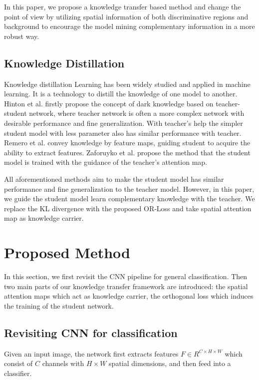 \documentclass{article}
\begin{document}
In this paper, we propose a knowledge transfer based method and change the point of view by utilizing spatial information of both discriminative regions and background to encourage the model mining complementary information in a more robust way.

\subsection{Knowledge Distillation} Knowledge distillation Learning has been widely studied and applied in machine learning. It is a technology to distill the knowledge of one model to another. Hinton et al. \cite{hinton2015distilling} firstly propose the concept of dark knowledge based on teacher-student network, where teacher network is often a more complex network with desirable performance and fine generalization. With teacher's help the simpler student model with less parameter also has similar performance with teacher. Remero et al. \cite{romero2015fitnets} convey knowledge by feature maps, guiding student to acquire the ability to extract features. Zaforuyko et al. \cite{zagoruyko2017paying} propose the method that the student model is trained with the guidance of the teacher's attention map.

All aforementioned methods aim to make the student model has similar performance and fine generalization to the teacher model. However, in this paper, we guide the student model learn complementary knowledge with the teacher. We replace the KL divergence with the proposed OR-Loss and take spatial attention map as knowledge carrier. 


\section{Proposed Method}

In this section, we first revisit the CNN pipeline for general classification. Then two main parts of our knowledge transfer framework are introduced: the spatial attention maps which act as knowledge carrier, the orthogonal loss which induces the training of the student network.


\subsection{Revisiting CNN for classification}
Given an input image, the network first extracts features $F\in R^{C\times H\times W}$ which consist of $C$ channels with $H\times W$ spatial dimensions, and then feed into a classifier.
\end{document}
